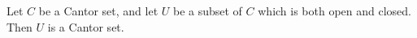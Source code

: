 Let $C$ be a Cantor set, and let $U$ be a subset of $C$ which is both open and closed. Then $U$ is a Cantor set.
